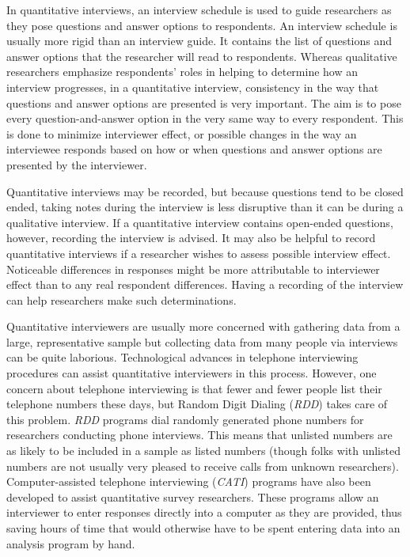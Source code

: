 In quantitative interviews, an interview schedule is used to guide researchers as they pose questions and answer options to respondents. An interview schedule is usually more rigid than an interview guide. It contains the list of questions and answer options that the researcher will read to respondents. Whereas qualitative researchers emphasize respondents' roles in helping to determine how an interview progresses, in a quantitative interview, consistency in the way that questions and answer options are presented is very important. The aim is to pose every question-and-answer option in the very same way to every respondent. This is done to minimize interviewer effect, or possible changes in the way an interviewee responds based on how or when questions and answer options are presented by the interviewer.

Quantitative interviews may be recorded, but because questions tend to be closed ended, taking notes during the interview is less disruptive than it can be during a qualitative interview. If a quantitative interview contains open-ended questions, however, recording the interview is advised. It may also be helpful to record quantitative interviews if a researcher wishes to assess possible interview effect. Noticeable differences in responses might be more attributable to interviewer effect than to any real respondent differences. Having a recording of the interview can help researchers make such determinations.

Quantitative interviewers are usually more concerned with gathering data from a large, representative sample but collecting data from many people via interviews can be quite laborious. Technological advances in telephone interviewing procedures can assist quantitative interviewers in this process. However, one concern about telephone interviewing is that fewer and fewer people list their telephone numbers these days, but Random Digit Dialing (\textit{RDD}) takes care of this problem. \textit{RDD} programs dial randomly generated phone numbers for researchers conducting phone interviews. This means that unlisted numbers are as likely to be included in a sample as listed numbers (though folks with unlisted numbers are not usually very pleased to receive calls from unknown researchers). Computer-assisted telephone interviewing (\textit{CATI}) programs have also been developed to assist quantitative survey researchers. These programs allow an interviewer to enter responses directly into a computer as they are provided, thus saving hours of time that would otherwise have to be spent entering data into an analysis program by hand. 

